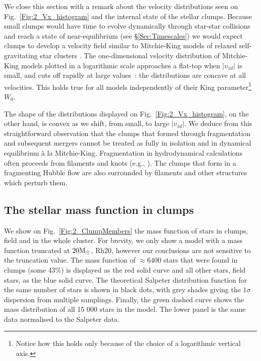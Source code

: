 We close this section with a remark about the velocity distributions seen on Fig.~\ref{Fig:2_Vx_histogram} and the internal state of the stellar clumps. Because small clumps would have time to evolve dynamically through star-star collisions and reach a state of near-equilibrium (see \S\ref{Sec:Timescales}) we would expect clumps to develop a velocity field similar to Mitchie-King models of  relaxed self-gravitating star clusters \citep{BT}.  The one-dimensional velocity distribution of Mitchie-King models plotted in a logarithmic scale approaches a flat-top when $|v_{1d}|$ is small,  and cuts off rapidly at large values~: the distributions are  concave at all velocities. This holds true for all models independently of their King parameter\footnote{Notice how this holds only because of the choice of a logarithmic vertical axis.} $W_0$. 

The shape of the distributions displayed on Fig.~\ref{Fig:2_Vx_histogram}, on the other hand, is convex as we shift, from small, to large $|v_{1d}|$. We deduce from this straightforward observation that the clumps that formed through fragmentation and subsequent mergers cannot be treated as fully in isolation and in dynamical equilibrium \`a la Mitchie-King.  Fragmentation in hydrodynamical calculations often proceeds from filaments and knots  (e.g., \citealt{Klessen2001,MacLow2004,Maschberger2010,Bate2014}). The clumps that form in a fragmenting  Hubble  flow are also surrounded by filaments and other structures which perturb them.




\subsection{The stellar mass function in clumps} 
\label{Sec:2_clumpmembers}


We show on Fig.~\ref{Fig:2_ClumpMembers} the mass function of stars in clumps, field and in the whole cluster. For brevity, we only show a model with a mass function truncated at $20 {\textrm{M}_\odot}$, Rh20,  however our conclusions are not sensitive to the truncation value. The mass function of $\approx 6400$ stars that were found in clumps (some 43\%) is displayed as the red solid curve and all other stars, field stars, as the blue solid curve. The theoretical Salpeter distribution function for the same number of stars is shown in black dots, with grey shades giving the  $1 \sigma$ dispersion from multiple samplings. Finally, the green dashed curve  shows the mass distribution of all 15 000 stars in the model. The lower panel is the same data normalised to the Salpeter data. 

